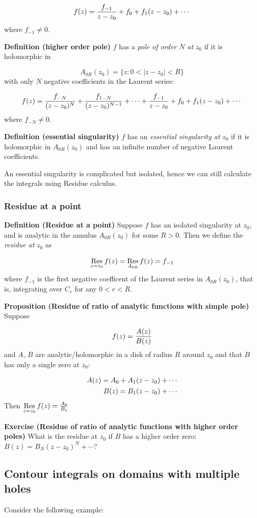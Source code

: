 \documentclass[12pt,a4paper]{article}
\begin{document}
\[
  f(z) = {f_{-1} \over z - z_0}  + f_0 + f_1 (z - z_0) + \cdots
\]
where $f_{-1} \neq 0$.

\textbf{Definition (higher order pole)} $f$ has a  \emph{pole of order $N$ at} ${z_0}$ if it is holomorphic in 

\[
 A_{0R}(z_0) = \{z : 0 < |z - z_0| < R \}
\]
with only $N$ negative coefficients in the Laurent series:

\[
 f(z) = {f_{-N} \over (z - z_0)^N}  + {f_{1-N} \over (z - z_0)^{N-1}} +  \cdots + {f_{-1} \over z-z_0} + f_0 + f_1 (z-z_0) + \cdots
\]
where $f_{-N} \neq 0$.

\textbf{Definition (essential singularity)} $f$ has an \emph{essential singularity at} $z_0$ if it is holomorphic in $A_{0R}(z_0)$ and has an infinite number of negative Laurent coefficients.

An essential singularity is complicated but isolated, hence we can still calculate the integrals using Residue calculus.

\subsubsection{Residue at a point}
\textbf{Definition (Residue at a point)} Suppose $f$ has an isolated singularity at $z_0$, and is analytic in the annulus $A_{0R}(z_0)$ for some $R > 0$. Then we define the \emph{residue at} $z_0$ as

\[
{\underset{z = z_0}{\rm Res}}\, f(z) = {\underset{A_{0R}}{\rm Res}}\, f(z) = f_{-1}
\]
where $f_{-1}$ is the first negative coefficent of the Laurent series in $A_{0R}(z_0)$, that is, integrating over $C_r$ for any $0 < r < R$. 

\textbf{Proposition (Residue of ratio of analytic functions with simple pole)} Suppose

\[
f(z) = {A(z) \over B(z)}
\]
and $A$, $B$ are analytic/holomorphic in a disk of radius $R$ around $z_0$ and that $B$ has only a single zero at $z_0$:


\begin{align*}
A(z) = A_0 + A_1(z-z_0) + \cdots \cr
B(z) = B_1(z-z_0) + \cdots
\end{align*}
Then ${\underset{z = z_0}{\rm Res}}\, f(z) = {A_0 \over B_1}$

\textbf{Exercise (Residue of ratio of analytic functions with higher order  poles)} What is the residue at $z_0$ if $B$ has a higher order zero: $B(z) = B_N (z-z_0)^N + \cdots$?

\subsection{Contour integrals on domains with multiple holes}
Consider the following example:
\end{document}
